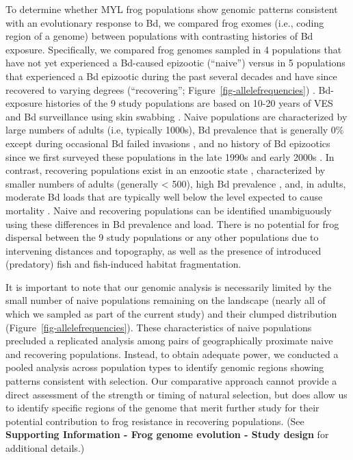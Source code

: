 \documentclass[9pt,twocolumn,twoside,lineno]{pnas-new}
\begin{document}
To determine whether MYL frog populations show genomic patterns
consistent with an evolutionary response to Bd, we compared frog exomes
(i.e., coding region of a genome) between populations with contrasting
histories of Bd exposure. Specifically, we compared frog genomes sampled
in 4 populations that have not yet experienced a Bd-caused epizootic
(``naive'') \citep{zhou2015} versus in 5 populations that experienced a
Bd epizootic during the past several decades and have since recovered to
varying degrees (``recovering''; Figure~\ref{fig-allelefrequencies})
\citep{knapp2016, vredenburg2010}. Bd-exposure histories of the 9 study
populations are based on 10-20 years of VES and Bd surveillance using
skin swabbing \citep[e.g.,][]{knapp2016, zhou2015, wilber2022}. Naive
populations are characterized by large numbers of adults (i.e, typically
1000s), Bd prevalence that is generally 0\% except during occasional Bd
failed invasions \citep[during which Bd loads remain very
low,][]{wilber2022}, and no history of Bd epizootics since we first
surveyed these populations in the late 1990s and early 2000s
\citep{zhou2015}. In contrast, recovering populations exist in an
enzootic state \citep{briggs2010}, characterized by smaller numbers of
adults (generally \textless{} 500), high Bd prevalence \citep[often
\textgreater{} 80\%,][]{knapp2011}, and, in adults, moderate Bd loads
that are typically well below the level expected to cause mortality
\citep{vredenburg2010}. Naive and recovering populations can be
identified unambiguously using these differences in Bd prevalence and
load. There is no potential for frog dispersal between the 9 study
populations or any other populations due to intervening distances and
topography, as well as the presence of introduced (predatory) fish and
fish-induced habitat fragmentation.

It is important to note that our genomic analysis is necessarily limited
by the small number of naive populations remaining on the landscape
(nearly all of which we sampled as part of the current study) and their
clumped distribution (Figure~\ref{fig-allelefrequencies}). These
characteristics of naive populations precluded a replicated analysis
among pairs of geographically proximate naive and recovering
populations. Instead, to obtain adequate power, we conducted a pooled
analysis across population types to identify genomic regions showing
patterns consistent with selection. Our comparative approach cannot
provide a direct assessment of the strength or timing of natural
selection, but does allow us to identify specific regions of the genome
that merit further study for their potential contribution to frog
resistance in recovering populations. (See \textbf{Supporting
Information - Frog genome evolution - Study design} for additional
details.)
\end{document}
